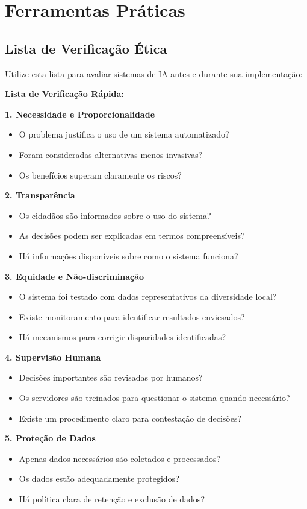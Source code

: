 \documentclass[12pt,a4paper]{article}
\begin{document}
\newpage
\section{Ferramentas Práticas}

\subsection{Lista de Verificação Ética}

Utilize esta lista para avaliar sistemas de IA antes e durante sua implementação:

\begin{tcolorbox}[highlight]
\textbf{Lista de Verificação Rápida:}

\textbf{1. Necessidade e Proporcionalidade}
\begin{itemize}
    \item [ ] O problema justifica o uso de um sistema automatizado?
    \item [ ] Foram consideradas alternativas menos invasivas?
    \item [ ] Os benefícios superam claramente os riscos?
\end{itemize}

\textbf{2. Transparência}
\begin{itemize}
    \item [ ] Os cidadãos são informados sobre o uso do sistema?
    \item [ ] As decisões podem ser explicadas em termos compreensíveis?
    \item [ ] Há informações disponíveis sobre como o sistema funciona?
\end{itemize}

\textbf{3. Equidade e Não-discriminação}
\begin{itemize}
    \item [ ] O sistema foi testado com dados representativos da diversidade local?
    \item [ ] Existe monitoramento para identificar resultados enviesados?
    \item [ ] Há mecanismos para corrigir disparidades identificadas?
\end{itemize}

\textbf{4. Supervisão Humana}
\begin{itemize}
    \item [ ] Decisões importantes são revisadas por humanos?
    \item [ ] Os servidores são treinados para questionar o sistema quando necessário?
    \item [ ] Existe um procedimento claro para contestação de decisões?
\end{itemize}

\textbf{5. Proteção de Dados}
\begin{itemize}
    \item [ ] Apenas dados necessários são coletados e processados?
    \item [ ] Os dados estão adequadamente protegidos?
    \item [ ] Há política clara de retenção e exclusão de dados?
\end{itemize}
\end{tcolorbox}
\end{document}
